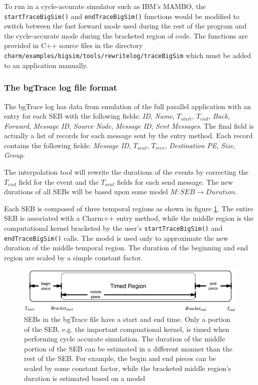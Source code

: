 To run in a cycle-accurate simulator such as IBM's MAMBO, the  \texttt{startTraceBigSim()} and  \texttt{endTraceBigSim()} functions would be modified to switch between the fast forward mode used during the rest of the program and the cycle-accurate mode during the bracketed region of code. The functions are provided in C++ source files in the directory \texttt{charm/examples/bigsim/tools/rewritelog/traceBigSim} which must be added to an application manually.

\subsubsection{The bgTrace log file format}

The bgTrace log has data from emulation of the full parallel application with an entry for each SEB with the following fields:  \textit{ID}, \textit{Name}, $T_{start}$, $T_{end}$, \textit{Back}, \textit{Forward}, \textit{Message ID}, \textit{Source Node}, \textit{Message ID}, \textit{Sent Messages}. The final field is actually a list of records for each message sent by the entry method. Each record contains the following fields:  \textit{Message ID}, $T_{sent}$, $T_{recv}$, \textit{Destination PE}, \textit{Size}, \textit{Group}.

The interpolation tool will rewrite the durations of the events by correcting the $T_{end}$ field for the event and the $T_{sent}$ fields for each send message. The new durations of all SEBs will be based upon some model $M:SEB\rightarrow Duration$. 

Each SEB is composed of three temporal regions as shown in figure \ref{event_diagram}. The entire SEB is associated with a Charm++ entry method, while the middle region is the computational kernel bracketed by the user's \texttt{startTraceBigSim()} and  \texttt{endTraceBigSim()} calls. The model is used only to approximate the new duration of the middle temporal region. The duration of the beginning and end region are scaled by a simple constant factor.

\begin{figure}
\centering
\includegraphics[width=5in]{figures/event_diagram}
\caption{SEBs in the bgTrace file have a start and end time. Only a portion of the SEB, e.g. the important compuational kernel, is timed when performing cycle accurate simulation. The duration of the middle portion of the SEB can be estimated in a different manner than the rest of the SEB. For example, the begin and end pieces can be scaled by some constant factor, while the bracketed middle region's duration is estimated based on a model\label{event_diagram}}
\end{figure}

